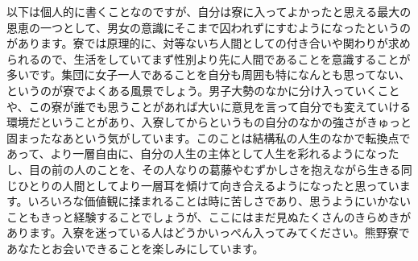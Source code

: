 以下は個人的に書くことなのですが、自分は寮に入ってよかったと思える最大の恩恵の一つとして、男女の意識にそこまで囚われずにすむようになったというのがあります。寮では原理的に、対等ないち人間としての付き合いや関わりが求められるので、生活をしていてまず性別より先に人間であることを意識することが多いです。集団に女子一人であることを自分も周囲も特になんとも思ってない、というのが寮でよくある風景でしょう。男子大勢のなかに分け入っていくことや、この寮が誰でも思うことがあれば大いに意見を言って自分でも変えていける環境だということがあり、入寮してからというもの自分のなかの強さがきゅっと固まったなあという気がしています。このことは結構私の人生のなかで転換点であって、より一層自由に、自分の人生の主体として人生を彩れるようになったし、目の前の人のことを、その人なりの葛藤やむずかしさを抱えながら生きる同じひとりの人間としてより一層耳を傾けて向き合えるようになったと思っています。いろいろな価値観に揉まれることは時に苦しさであり、思うようにいかないこともきっと経験することでしょうが、ここにはまだ見ぬたくさんのきらめきがあります。入寮を迷っている人はどうかいっぺん入ってみてください。熊野寮であなたとお会いできることを楽しみにしています。

